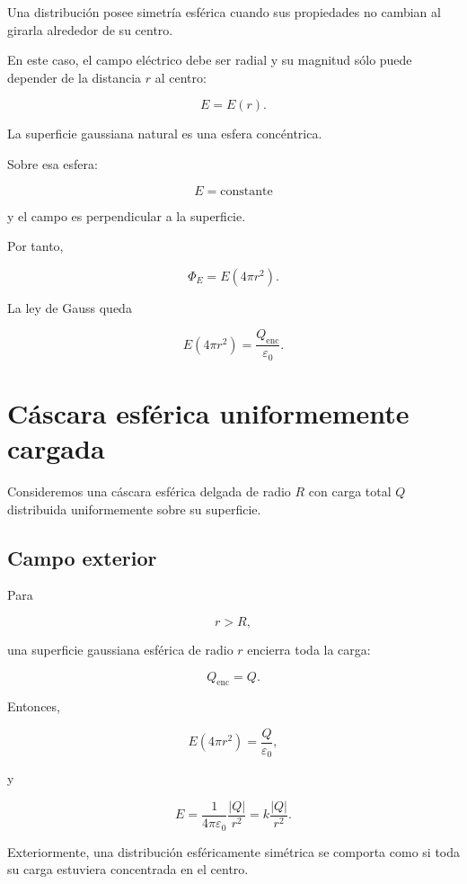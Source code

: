 Una distribución posee simetría esférica cuando sus propiedades no cambian al girarla
alrededor de su centro.

En este caso, el campo eléctrico debe ser radial y su magnitud sólo puede depender de
la distancia \(r\) al centro:

\[
E=E(r).
\]

La superficie gaussiana natural es una esfera concéntrica.

Sobre esa esfera:

\[
E=\text{constante}
\]

y el campo es perpendicular a la superficie.

Por tanto,

\[
\Phi_E=E(4\pi r^2).
\]

La ley de Gauss queda

\begin{equation}
\boxed{
E(4\pi r^2)=\frac{Q_{\text{enc}}}{\varepsilon_0}
}.
\label{eq:gauss_simetria_esferica}
\end{equation}


\section{Cáscara esférica uniformemente cargada}

Consideremos una cáscara esférica delgada de radio \(R\) con carga total \(Q\)
distribuida uniformemente sobre su superficie.


\subsection{Campo exterior}

Para

\[
r>R,
\]

una superficie gaussiana esférica de radio \(r\) encierra toda la carga:

\[
Q_{\text{enc}}=Q.
\]

Entonces,

\[
E(4\pi r^2)=\frac{Q}{\varepsilon_0},
\]

y

\begin{equation}
\boxed{
E=\frac{1}{4\pi\varepsilon_0}\frac{|Q|}{r^2}
=k\frac{|Q|}{r^2}
}.
\label{eq:campo_cascara_exterior}
\end{equation}

Exteriormente, una distribución esféricamente simétrica se comporta como si toda su
carga estuviera concentrada en el centro.


